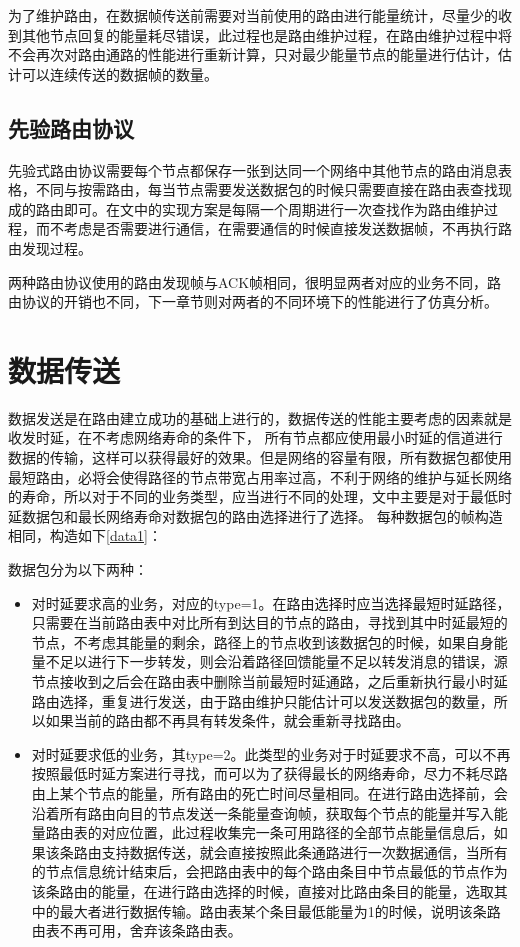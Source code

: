 \documentclass[a4paper,AutoFakeBold,oneside,12pt]{book}
\begin{document}
  为了维护路由，在数据帧传送前需要对当前使用的路由进行能量统计，尽量少的收到其他节点回复的能量耗尽错误，此过程也是路由维护过程，在路由维护过程中将不会再次对路由通路的性能进行重新计算，只对最少能量节点的能量进行估计，估计可以连续传送的数据帧的数量。
  \subsection{先验路由协议}
  先验式路由协议需要每个节点都保存一张到达同一个网络中其他节点的路由消息表格，不同与按需路由，每当节点需要发送数据包的时候只需要直接在路由表查找现成的路由即可。在文中的实现方案是每隔一个周期进行一次查找作为路由维护过程，而不考虑是否需要进行通信，在需要通信的时候直接发送数据帧，不再执行路由发现过程。
  
  两种路由协议使用的路由发现帧与ACK帧相同，很明显两者对应的业务不同，路由协议的开销也不同，下一章节则对两者的不同环境下的性能进行了仿真分析。
  \section{数据传送}
  数据发送是在路由建立成功的基础上进行的，数据传送的性能主要考虑的因素就是收发时延，在不考虑网络寿命的条件下， 所有节点都应使用最小时延的信道进行数据的传输，这样可以获得最好的效果。但是网络的容量有限，所有数据包都使用最短路由，必将会使得路径的节点带宽占用率过高，不利于网络的维护与延长网络的寿命，所以对于不同的业务类型，应当进行不同的处理，文中主要是对于最低时延数据包和最长网络寿命对数据包的路由选择进行了选择。
  每种数据包的帧构造相同，构造如下\ref{data1}：
  
  数据包分为以下两种：
  \begin{itemize}
  \item 对时延要求高的业务，对应的type=1。在路由选择时应当选择最短时延路径，只需要在当前路由表中对比所有到达目的节点的路由，寻找到其中时延最短的节点，不考虑其能量的剩余，路径上的节点收到该数据包的时候，如果自身能量不足以进行下一步转发，则会沿着路径回馈能量不足以转发消息的错误，源节点接收到之后会在路由表中删除当前最短时延通路，之后重新执行最小时延路由选择，重复进行发送，由于路由维护只能估计可以发送数据包的数量，所以如果当前的路由都不再具有转发条件，就会重新寻找路由。
  \item 对时延要求低的业务，其type=2。此类型的业务对于时延要求不高，可以不再按照最低时延方案进行寻找，而可以为了获得最长的网络寿命，尽力不耗尽路由上某个节点的能量，所有路由的死亡时间尽量相同。在进行路由选择前，会沿着所有路由向目的节点发送一条能量查询帧，获取每个节点的能量并写入能量路由表的对应位置，此过程收集完一条可用路径的全部节点能量信息后，如果该条路由支持数据传送，就会直接按照此条通路进行一次数据通信，当所有的节点信息统计结束后，会把路由表中的每个路由条目中节点最低的节点作为该条路由的能量，在进行路由选择的时候，直接对比路由条目的能量，选取其中的最大者进行数据传输。路由表某个条目最低能量为1的时候，说明该条路由表不再可用，舍弃该条路由表。
  \end{itemize}
\end{document}
